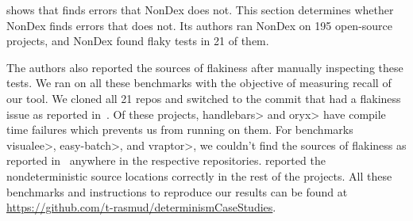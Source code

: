  shows that \theDeterminismChecker finds errors that NonDex does not.
This section determines whether NonDex finds errors that \theDeterminismChecker does not.
Its authors ran NonDex on 195 open-source projects, and NonDex found flaky tests in
21 of them.


The authors also reported the sources of flakiness
after manually inspecting these tests. We ran \TheDeterminismChecker on all these benchmarks with the objective
of measuring recall of our tool. We cloned all 21 repos and switched to the commit that had a flakiness issue as reported 
in~\cite{nondex}. Of these projects, \<handlebars> and \<oryx> have compile time failures which prevents us from running \TheDeterminismChecker on them. For benchmarks \<visualee>, \<easy-batch>, and \<vraptor>, we couldn't find
the sources of flakiness as reported in~\cite{nondex} anywhere in the respective repositories.
\TheDeterminismChecker reported the nondeterministic source locations correctly in the rest of the projects.
All these benchmarks and instructions to reproduce our results can be found at \href{https://github.com/t-rasmud/determinismCaseStudies}{https://github.com/t-rasmud/determinismCaseStudies}.

